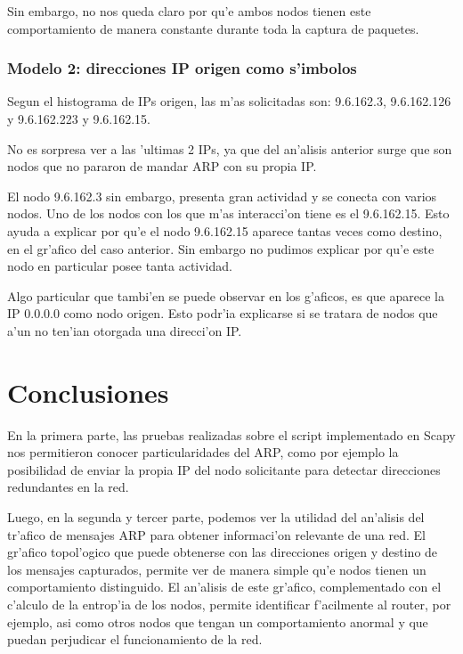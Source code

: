 \documentclass[a4paper,10pt]{article}
\begin{document}
Sin embargo, no nos queda claro por qu'e ambos nodos tienen este comportamiento de manera constante durante toda la captura de paquetes.

\subsubsection{Modelo 2: direcciones IP origen como s'imbolos}

Segun el histograma de IPs origen, las m'as solicitadas son: 9.6.162.3, 9.6.162.126 y 9.6.162.223 y 9.6.162.15.

No es sorpresa ver a las 'ultimas 2 IPs, ya que del an'alisis anterior surge que son nodos que no pararon de mandar ARP con su propia IP.

El nodo 9.6.162.3 sin embargo, presenta gran actividad y se conecta con varios nodos. Uno de los nodos con los que m'as interacci'on tiene es el 9.6.162.15. Esto ayuda a explicar por qu'e el nodo 9.6.162.15 aparece tantas veces como destino, en el gr'afico del caso anterior. Sin embargo no pudimos explicar por qu'e este nodo en particular posee tanta actividad.

Algo particular que tambi'en se puede observar en los g'aficos, es que aparece la IP 0.0.0.0 como nodo origen. Esto podr'ia explicarse si se tratara de nodos que a'un no ten'ian otorgada una direcci'on IP.

\section{Conclusiones}
\label{conclusion1:}

En la primera parte, las pruebas realizadas sobre el script implementado en Scapy nos permitieron conocer particularidades del ARP, como por ejemplo la posibilidad de enviar la propia IP del nodo solicitante para detectar direcciones redundantes en la red.

Luego, en la segunda y tercer parte, podemos ver la utilidad del an'alisis del tr'afico de mensajes ARP para obtener informaci'on relevante de una red. El gr'afico topol'ogico que puede obtenerse con las direcciones origen y destino de los mensajes capturados, permite ver de manera simple qu'e nodos tienen un comportamiento distinguido. El an'alisis de este gr'afico, complementado con el c'alculo de la entrop'ia de los nodos, permite identificar f'acilmente al router, por ejemplo, asi como otros nodos que tengan un comportamiento anormal y que puedan perjudicar el funcionamiento de la red.
\end{document}
